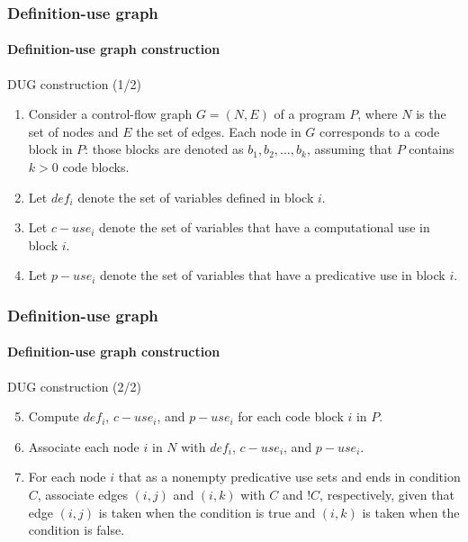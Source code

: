 \begin{frame}
\label{concept:dug-construction}
\frametitle{Definition-use graph}
\framesubtitle{Definition-use graph construction}

\begin{block:procedure}{DUG construction (1/2)}
\begin{enumerate}
	\item Consider a control-flow graph $G = (N, E)$ of a program $P$, where
	$N$ is the set of nodes and $E$ the set of edges. Each node in $G$
	corresponds to a code block in $P$: those blocks are denoted as
	$b_1, b_2, ..., b_k$, assuming that $P$ contains $k > 0$ code blocks.

	\item Let $def_i$ denote the set of variables defined in block $i$.

	\item Let $c-use_i$ denote the set of variables that have a computational
	use in block $i$.

	\item Let $p-use_i$ denote the set of variables that have a predicative
	use in block $i$.
\end{enumerate}
\end{block:procedure}

\hfill
{}
\end{frame}



\begin{frame}
\frametitle{Definition-use graph}
\framesubtitle{Definition-use graph construction}

\begin{block:procedure}{DUG construction (2/2)}
\begin{enumerate}
	\setcounter{enumi}{4}
	\item Compute $def_i$, $c-use_i$, and $p-use_i$ for each code block $i$ in
	$P$.

	\item Associate each node $i$ in $N$ with $def_i$, $c-use_i$, and $p-use_i$.

	\item For each node $i$ that as a nonempty predicative use sets and ends in
	condition $C$, associate edges $(i, j)$ and $(i, k)$ with $C$ and $!C$,
	respectively, given that edge $(i, j)$ is taken when the condition is true
	and $(i, k)$ is taken when the condition is false.
\end{enumerate}
\end{block:procedure}

\hfill
{}
\end{frame}